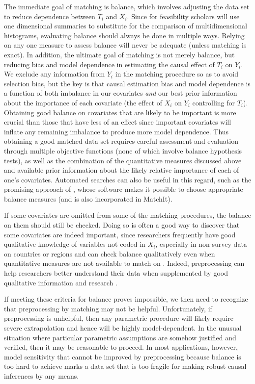 \documentclass[11pt,titlepage]{article}
\begin{document}
The immediate goal of matching is balance, which involves adjusting
the data set to reduce dependence between $T_i$ and $X_i$.  Since for
feasibility scholars will use one dimensional summaries to substitute
for the comparison of multidimensional histograms, evaluating balance
should always be done in multiple ways.  Relying on any one measure to
assess balance will never be adequate (unless matching is exact).  In
addition, the ultimate goal of matching is not merely balance, but
reducing bias and model dependence in estimating the causal effect of
$T_i$ on $Y_i$.  We exclude any information from $Y_i$ in the matching
procedure so as to avoid selection bias, but the key is that causal
estimation bias and model dependence is a function of both imbalance
in our covariates \emph{and} our best prior information about the
importance of each covariate (the effect of $X_i$ on $Y_i$ controlling
for $T_i$).  Obtaining good balance on covariates that are likely to
be important is more crucial than those that have less of an effect
since important covariates will inflate any remaining imbalance to
produce more model dependence.  Thus obtaining a good matched data set
requires careful assessment and evaluation through multiple objective
functions (none of which involve balance hypothesis tests), as well as
the combination of the quantitative measures discussed above and
available prior information about the likely relative importance of
each of one's covariates.  Automated searches can also be useful in
this regard, such as the promising approach of \citet{DiaSek05}, whose 
software makes it possible to choose appropriate balance
measures (and is also incorporated in MatchIt).

If some covariates are omitted from some of the matching procedures,
the balance on them should still be checked.  Doing so is often a good
way to discover that some covariates are indeed important, since
researchers frequently have good qualitative knowledge of variables
not coded in $X_i$, especially in non-survey data on countries or
regions and can check balance qualitatively even when quantitative
measures are not available to match on \citep[][Ch.3]{Rosenbaum02}.
Indeed, preprocessing can help researchers better understand their
data when supplemented by good qualitative information and research
\citep[e.g.,][]{RosSil01}.

If meeting these criteria for balance proves impossible, we then need
to recognize that preprocessing by matching may not be helpful.
Unfortunately, if preprocessing is unhelpful, then any parametric
procedure will likely require severe extrapolation and hence will be
highly model-dependent.  In the unusual situation where particular
parametric assumptions are somehow justified and verified, then it may
be reasonable to proceed.  In most applications, however, model
sensitivity that cannot be improved by preprocessing because balance
is too hard to achieve marks a data set that is too fragile for making
robust causal inferences by any means.
\end{document}
